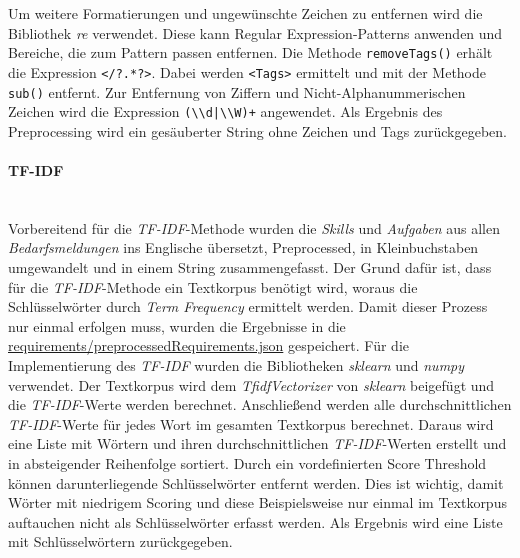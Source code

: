 Um weitere Formatierungen und ungewünschte Zeichen zu entfernen wird die Bibliothek \emph{re} verwendet. Diese kann Regular Expression-Patterns anwenden und Bereiche, die zum Pattern passen entfernen.
%	
Die Methode \lstinline{removeTags()} erhält die Expression \lstinline{</?.*?>}. Dabei werden \lstinline{<Tags>} ermittelt und mit der Methode \lstinline{sub()} entfernt. Zur Entfernung von Ziffern und Nicht-Alphanummerischen Zeichen wird die Expression \lstinline{(\\d|\\W)+} angewendet. Als Ergebnis des Preprocessing wird ein gesäuberter String ohne Zeichen und Tags zurückgegeben.
\paragraph{TF-IDF}\mbox{}\\
Vorbereitend für die \emph{TF-IDF}-Methode wurden die \emph{Skills} und \emph{Aufgaben} aus allen \emph{Bedarfsmeldungen} ins Englische übersetzt, Preprocessed, in Kleinbuchstaben umgewandelt und in einem String zusammengefasst. Der Grund dafür ist, dass für die \emph{TF-IDF}-Methode ein Textkorpus benötigt wird, woraus die Schlüsselwörter durch \emph{Term Frequency} ermittelt werden. Damit dieser Prozess nur einmal erfolgen muss, wurden die Ergebnisse in die \url{requirements/preprocessedRequirements.json} gespeichert. Für die Implementierung des \emph{TF-IDF} wurden die Bibliotheken \emph{sklearn} und \emph{numpy} verwendet. Der Textkorpus wird dem \emph{TfidfVectorizer} von \emph{sklearn} beigefügt und die \emph{TF-IDF}-Werte werden berechnet. Anschließend werden alle durchschnittlichen \emph{TF-IDF}-Werte für jedes Wort im gesamten Textkorpus berechnet. Daraus wird eine Liste mit Wörtern und ihren durchschnittlichen \emph{TF-IDF}-Werten erstellt und in absteigender Reihenfolge sortiert. Durch ein vordefinierten Score Threshold können darunterliegende Schlüsselwörter entfernt werden. Dies ist wichtig, damit Wörter mit niedrigem Scoring und diese Beispielsweise nur einmal im Textkorpus auftauchen nicht als Schlüsselwörter erfasst werden. Als Ergebnis wird eine Liste mit Schlüsselwörtern zurückgegeben.

